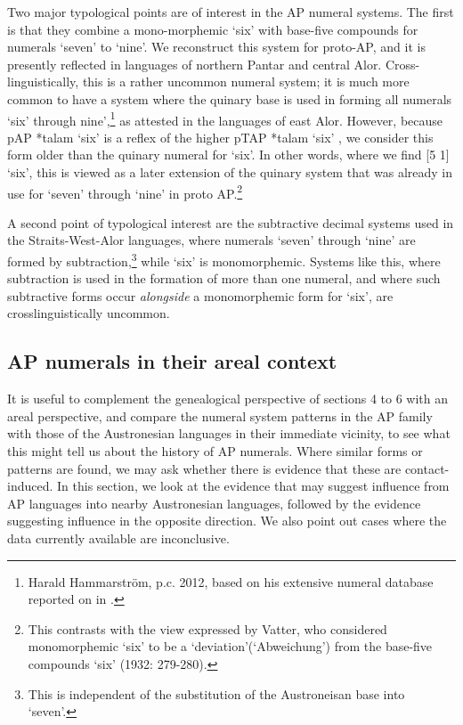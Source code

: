 Two major typological points are of interest in the AP numeral systems. The first is that they combine a mono-morphemic `six' with base-five compounds for numerals `seven' to `nine'. We reconstruct this system for proto-AP, and it is presently reflected in languages of northern Pantar and central Alor. Cross-linguistically, this is a rather uncommon numeral system; it is much more common to have a system where the quinary base is used in forming all numerals `six' through nine',\footnote{Harald Hammarstr\"om, p.c. 2012, based on his extensive numeral database reported on in \citet{Hammarstrom2010}.} as attested in the languages of east Alor. However, because pAP *talam `six' is a reflex of the higher pTAP *talam `six' \citep{SchapperEtAlTVtimor}, we consider this form older than the quinary numeral for `six'. In other words, where we find [5 1] `six', this is viewed as a later extension of the quinary system that was already in use for `seven' through `nine' in proto AP.\footnote{This contrasts with the view expressed by Vatter, who considered monomorphemic `six' to be a `deviation'(`Abweichung') from the base-five compounds `six' (1932: 279-280).}\nocite{Vatter1932}

A second point of typological interest are the subtractive decimal systems used in the Straits-West-Alor languages, where numerals `seven' through `nine' are formed by subtraction,\footnote{This is independent of the substitution of the Austroneisan base into `seven'.} while `six' is monomorphemic. Systems like this, where subtraction is used in the formation of more than one numeral, and where such subtractive forms occur \textit{alongside} a monomorphemic form for `six', are crosslinguistically uncommon. 

\subsection{AP numerals in their areal context}\label{sec:6:7.2}
It is useful to complement the genealogical perspective of sections 4 to 6 with an areal perspective, and compare the numeral system patterns in the AP family with those of the Austronesian languages in their immediate vicinity, to see what this might tell us about the history of AP numerals. Where similar forms or patterns are found, we may ask whether there is evidence that these are contact-induced. In this section, we look at the evidence that may suggest influence from AP languages into nearby Austronesian languages, followed by the evidence suggesting influence in the opposite direction. We also point out cases where the data currently available are inconclusive. 

